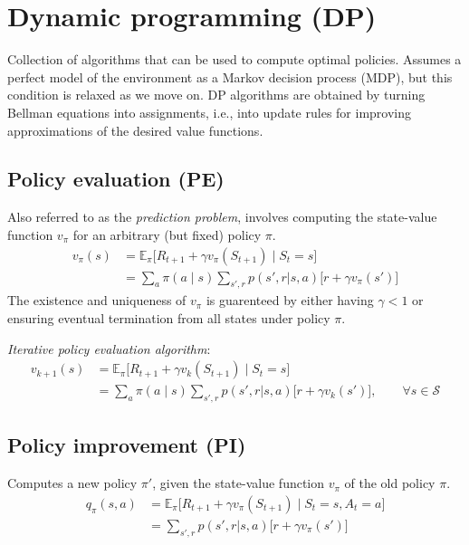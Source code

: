 \section{Dynamic programming (DP)}

Collection of algorithms that can be used to compute optimal policies.
Assumes a perfect model of the environment as a Markov decision process (MDP), but this condition is relaxed as we move on.
DP algorithms are obtained by turning Bellman equations into assignments, i.e., into update rules for improving approximations of the desired value functions.

\subsection{Policy evaluation (PE)}

Also referred to as the \textit{prediction problem}, involves computing the state-value function \( v_\pi \) for an arbitrary (but fixed) policy \( \pi \).
\begin{equation}
    \begin{aligned}
        v_\pi(s)
         & =
        \mathbb{E}_{\pi} \big[ R_{t+1} + \gamma v_\pi(S_{t+1}) \;\big|\; S_t = s \big]
        \\ & =
        \sum_{a} \pi(a \mid s) \sum_{s', r} p(s', r | s, a) \Big[ r + \gamma v_\pi(s') \Big]
    \end{aligned}
\end{equation}
The existence and uniqueness of \( v_\pi \) is guarenteed by either having \( \gamma < 1 \) or ensuring eventual termination from all states under policy \( \pi \).

\textit{Iterative policy evaluation algorithm}:
\begin{equation}
    \begin{aligned}
        v_{k+1}(s)
         & =
        \mathbb{E}_{\pi} \big[ R_{t+1} + \gamma v_k(S_{t+1}) \;\big|\; S_t = s \big]
        \\ & =
        \sum_{a} \pi(a \mid s) \sum_{s', r} p(s', r | s, a) \Big[ r + \gamma v_k(s') \Big]
        , \qquad \forall s \in \mathcal{S}
    \end{aligned}
\end{equation}

\subsection{Policy improvement (PI)}

Computes a new policy \( \pi' \), given the state-value function \( v_\pi \) of the old policy \( \pi \).
\begin{equation}
    \begin{aligned}
        q_\pi(s, a)
         & =
        \mathbb{E}_{\pi} \big[ R_{t+1} + \gamma v_\pi(S_{t+1}) \;\big|\; S_t = s, A_t = a \big]
        \\ & =
        \sum_{s', r} p(s', r | s, a) \Big[ r + \gamma v_\pi(s') \Big]
    \end{aligned}
\end{equation}

